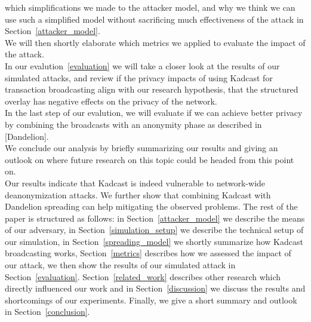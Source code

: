 which simplifications we made to the attacker model, and why we think we can use such a simplified model
without sacrificing much effectiveness of the attack in
Section~\ref{attacker_model}. \\
We will then shortly elaborate which metrics we applied to evaluate the impact of the attack. \\
In our evalution~\ref{evaluation} we will take a closer look at the results of our simulated attacks, and
review if the privacy impacts of using Kadcast for transaction broadcasting align with our
research hypothesis, that the structured overlay has negative effects on the privacy of the network. \\
In the last step of our evalution, we will evaluate if we can achieve
better privacy
by combining the broadcasts with an anonymity phase as described in [Dandelion]. \\
We conclude our analysis by briefly summarizing our results and giving an outlook
on where future research on this topic could be headed from this point on. \\
Our results indicate that Kadcast is indeed
vulnerable to network-wide deanonymization attacks. We further show that combining
Kadcast with Dandelion spreading can help mitigating the observed problems.
The rest of the paper is structured as follows: in
Section~\ref{attacker_model} we describe the means of our adversary, in Section~\ref{simulation_setup} we describe the
technical setup of our simulation, in
Section~\ref{spreading_model} we shortly summarize how Kadcast
broadcasting works, Section~\ref{metrics} describes how we assessed the
impact of our attack, we then show the results of our simulated attack
in Section~\ref{evaluation}. Section~\ref{related_work} describes other
research which directly influenced our work and in
Section~\ref{discussion} we discuss the results and shortcomings of our
experiments. Finally, we give a short summary and outlook in
Section~\ref{conclusion}.
